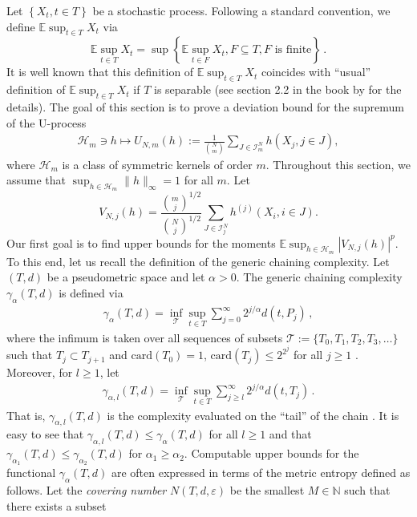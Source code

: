 \documentclass[12pt]{article}
\newcommand{\eps}{\varepsilon}
\def\l{\left}
\def\r{\right}
\newcommand{\m}{\mathcal}
\newcommand{\mb}{\mathbb}
\theoremstyle{thmstyletwo}%
\theoremstyle{thmstylethree}%
\begin{document}
Let $\l\{X_t, t \in T\r\}$ be a stochastic process. Following a standard convention, we define $\mb E \sup_{t \in T} X_t$ via
\begin{equation}
\label{def:sup}
    \mb E \sup_{t \in T} X_t = \sup\l\{\mb E \sup_{t \in F} X_t, F \subseteq T,  F \text{ is finite}\r\}\,.
\end{equation}
It is well known that this definition of $\mb E \sup_{t \in T} X_t$ coincides with ``usual'' definition of $\mb E \sup_{t \in T}X_t$ if $T$ is separable (see section 2.2 in the book by \citet{talagrand2014upper} for the details). 
The goal of this section is to prove a deviation bound for the supremum of the U-process
\begin{align*}
\m H_m \ni  h \mapsto  U_{N,m}(h) :=  \frac{1}{{N \choose m}}  \sum_{J \in \mathcal{I}_m^N} h\l(X_j, j \in J\r),
\end{align*}
where $\mathcal{H}_m$ is a class of symmetric kernels of order $m$. Throughout this section, we assume that $\sup_{h \in \mathcal{H}_m}\|h\|_\infty = 1$ for all $m$. Let 
\[
V_{N,j}(h) = \frac{{m \choose j}^{1/2}}{{N \choose j}^{1/2}} \sum_{J \in \mathcal{I}^N_j} h^{(j)}\l(X_i, i \in J\r).
\] 
Our first goal is to find upper bounds for the moments $\mb E\sup_{h \in \mathcal{H}_m} \l\lvert V_{N,j}(h) \r\rvert^p$. To this end, let us recall the definition of the generic chaining complexity. Let $(T,d)$ be a pseudometric space and let $\alpha > 0$. The generic chaining complexity 
$\gamma_\alpha(T,d)$ is defined via
\begin{align}
\label{eq:gamma_alpha}
    \gamma_\alpha(T, d) = \inf_\mathcal{T} \sup_{t \in T} \sum_{j=0}^\infty 2^{j/\alpha} d(t, P_j)\,,
\end{align}
where the infimum is taken over all sequences of subsets $\mathcal{T} := \{T_0,T_1, T_2, T_3, \ldots\}$ such that $T_j\subset T_{j+1}$ and $\mathrm{card}(T_0)=1$, $\mathrm{card}(T_j)\leq 2^{2^j}$ for all $j\geq 1$ \citep{talagrand2014upper}. Moreover, for $l \geq 1$, let
\begin{align}
\label{eq:gamma_alpha_l}
    \gamma_{\alpha, l}(T, d) = \inf_\mathcal{T} \sup_{t \in T} \sum_{j \geq l}^\infty 2^{j/\alpha} d(t, T_j)\,.
\end{align}
That is, $\gamma_{\alpha, l}(T, d)$ is the complexity evaluated on the ``tail'' of the chain \citep{dirksen2015tail}. It is easy to see that $\gamma_{\alpha, l}(T, d) \leq \gamma_{\alpha}(T, d)$ for all $l \geq 1$ and that $\gamma_{\alpha_1}(T, d)\leq \gamma_{\alpha_2}(T, d)$ for $\alpha_1\geq \alpha_2$. 
Computable upper bounds for the functional $\gamma_{\alpha}(T, d)$ are often expressed in terms of  the metric entropy defined as follows. Let the \emph{covering number} $N(T,d,\eps)$ be the smallest $M\in \mb N$ such that there exists a subset 
\end{document}
